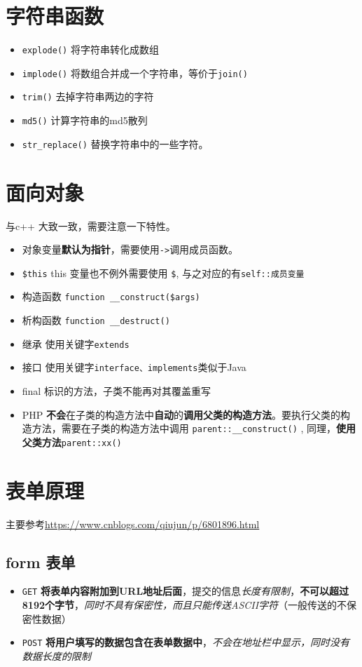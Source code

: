 \documentclass[UTF8,a4paper,12pt]{ctexbook}
\begin{document}
	
	\section{字符串函数}
		\begin{itemize}
			\item \verb|explode()| 将字符串转化成数组
			\item \verb|implode()| 将数组合并成一个字符串，等价于\verb|join()|
			\item \verb|trim()| 去掉字符串两边的字符
			\item \verb|md5()| 计算字符串的md5散列
			\item \verb|str_replace()| 替换字符串中的一些字符。
		\end{itemize}		
	\section{面向对象}
		与c++  大致一致，需要注意一下特性。
		\begin{itemize}
			\item 对象变量\textbf{默认为指针}，需要使用\verb|->|调用成员函数。
			\item \verb|$this| this 变量也不例外需要使用 \verb|$|, 与之对应的有\verb|self::成员变量 |
			\item 构造函数 \verb|function __construct($args)|
			\item 析构函数 \verb|function __destruct()|
			\item 继承 使用关键字\verb|extends |
			\item 接口 使用关键字\verb|interface、implements|类似于Java
			\item final 标识的方法，子类不能再对其覆盖重写
			\item PHP \textbf{不会}在子类的构造方法中\textbf{自动}的\textbf{调用父类的构造方法}。要执行父类的构造方法，需要在子类的构造方法中调用 \verb|parent::__construct()| , 同理，\textbf{使用父类方法}\verb|parent::xx()|
		\end{itemize}
		
	
	
	\section{表单原理}
		主要参考\url{https://www.cnblogs.com/qiujun/p/6801896.html}
		
		\subsection{form 表单}
			\begin{itemize}
				\item \verb|GET| \textbf{将表单内容附加到URL地址后面}，提交的信息\textit{长度有限制}，\textbf{不可以超过8192个字节}，\textit{同时不具有保密性，而且只能传送ASCII字符}（一般传送的不保密性数据）
				\item \verb|POST| \textbf{将用户填写的数据包含在表单数据中}，\textit{不会在地址栏中显示，同时没有数据长度的限制}
			\end{itemize}
			
\end{document}
